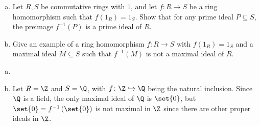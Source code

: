 \documentclass[10pt]{mypackage}
\begin{document}
\begin{problem}[Problem 4]\hfill
  \begin{enumerate}[(a)]
    \item Let $R,S$ be commutative rings with $1$, and let $f\colon R\rightarrow S$ be a ring homomorphism such that $f\left( 1_R \right) = 1_S$. Show that for any prime ideal $ P\subseteq S $, the preimage $f^{-1}\left( P \right)$ is a prime ideal of $R$.
    \item Give an example of a ring homomorphism $f\colon R\rightarrow S$ with $f\left( 1_{R} \right) = 1_S$ and a maximal ideal $M\subseteq S$ such that $f^{-1}\left( M \right)$ is not a maximal ideal of $R$.
  \end{enumerate}
\end{problem}
\begin{solution}\hfill
  \begin{enumerate}[(a)]
    \item 
    \item Let $R = \Z$ and $S = \Q$, with $f\colon \Z\hookrightarrow \Q$ being the natural inclusion. Since $\Q$ is a field, the only maximal ideal of $\Q$ is $\set{0}$, but $\set{0} = f^{-1}\left( \set{0} \right)$ is not maximal in $\Z$ since there are other proper ideals in $\Z$.
  \end{enumerate}
\end{solution}
\end{document}
